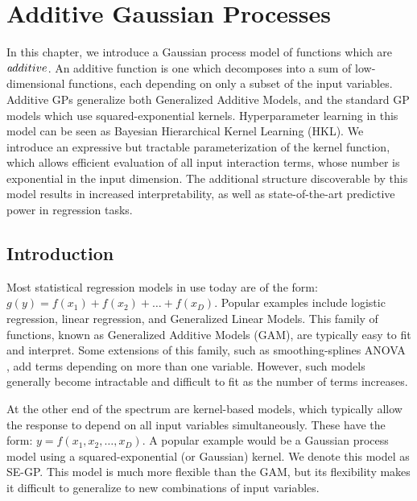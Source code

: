 
\inbpdocument

\newcommand{\additivefigsdir}{additive-figures}
\newcommand{\additivetablesdir}{additive-tables}

\chapter{Additive Gaussian Processes}
\label{ch:additive}

In this chapter, we introduce a Gaussian process model of functions which are $\textit additive$.  An additive function is one which decomposes into a sum of low-dimensional functions, each depending on only a subset of the input variables. Additive GPs generalize both Generalized Additive Models, and the standard GP models which use squared-exponential kernels.  Hyperparameter learning in this model can be seen as Bayesian Hierarchical Kernel Learning (HKL).  We introduce an expressive but tractable parameterization of the kernel function, which allows efficient evaluation of all input interaction terms, whose number is exponential in the input dimension.  The additional structure discoverable by this model results in increased interpretability, as well as state-of-the-art predictive power in regression tasks.

\section{Introduction}
Most statistical regression models in use today are of the form: $g(y) = f(x_1) + f(x_2) + \dots + f(x_D)$.  Popular examples include logistic regression, linear regression, and Generalized Linear Models\cite{nelder1972generalized}.  This family of functions, known as Generalized Additive Models (GAM)\cite{hastie1990generalized}, are typically easy to fit and interpret.   Some extensions of this family, such as smoothing-splines ANOVA \cite{wahba1990spline}, add terms depending on more than one variable.  However, such models generally become intractable and difficult to fit as the number of terms increases.

At the other end of the spectrum are kernel-based models, which typically allow the response to depend on all input variables simultaneously.  These have the form: $y = f(x_1, x_2, \dots, x_D)$.  A popular example would be a Gaussian process model using a squared-exponential (or Gaussian) kernel.  We denote this model as SE-GP.  This model is much more flexible than the GAM, but its flexibility makes it difficult to generalize to new combinations of input variables. %

